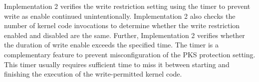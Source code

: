 
%
Implementation 2 verifies the write restriction setting using the timer to
prevent write as enable continued unintentionally.
%
Implementation 2 also checks the number of kernel code invocations to determine whether the
write restriction enabled and disabled are the same.
%
Further, Implementation 2 verifies whether the duration of write enable exceeds
the specified time.
%
The timer is a complementary feature to prevent misconfiguration of
  the PKS protection setting. 
%
This timer usually requires sufficient time to miss it between starting and
finishing the execution of the write-permitted kernel code.




  
  
    
